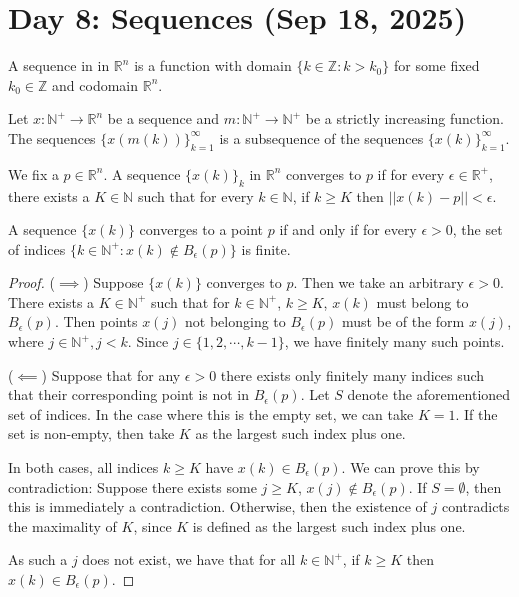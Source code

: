 \section{Day 8: Sequences (Sep 18, 2025)}

\begin{definition}[Sequence]
A sequence in in $\mathbb{R}^n$ is a function with domain $\{ k \in \mathbb{Z} : k > k_0 \}$ for some fixed $k_0 \in \mathbb{Z}$ and codomain $\mathbb{R}^n$. 
\end{definition}

\begin{definition}[Subsequence]
    Let $x : \mathbb{N}^+ \to \mathbb{R}^n$ be a sequence and $m : \mathbb{N}^+ \to \mathbb{N}^+$ be a strictly increasing function. The sequences $\{ x(m(k)) \}_{k=1}^\infty$ is a subsequence of the sequences $\{ x(k) \}_{k=1}^\infty$.
\end{definition}

\begin{definition}[Convergence]
    We fix a $p \in \mathbb{R}^n$. A sequence $\{ x(k) \}_k$ in $\mathbb{R}^n$ converges to $p$ if for every $\epsilon \in \mathbb{R}^+$, there exists a $K \in \mathbb{N}$ such that for every $k \in \mathbb{N}$, if $k \geq K$ then  $||x(k) - p|| < \epsilon$.
\end{definition}

\begin{simplethm}
    A sequence $\{ x(k) \}$ converges to a point $p$ if and only if for every $\epsilon > 0$, the set of indices $\{ k \in \mathbb{N}^+ : x(k) \not \in B_ \epsilon(p)\}$ is finite.
\end{simplethm}

\begin{proof}
    ($\implies$) Suppose $\{ x(k) \}$ converges to $p$. Then we take an arbitrary $\epsilon > 0$. There exists a $K \in \mathbb{N}^+$ such that for $k \in \mathbb{N}^+$, $k \geq K$, $x(k)$ must belong to $B _ \epsilon(p)$. Then points $x(j)$ not belonging to $B_ \epsilon(p)$ must be of the form $x(j)$, where $j \in \mathbb{N}^+, j < k$. Since $j \in \{ 1, 2, \cdots, k - 1 \}$, we have finitely many such points.

($\impliedby$) Suppose that for any $\epsilon > 0$ there exists only finitely many indices such that their corresponding point is not in $B_ \epsilon (p)$. Let $S$ denote the aforementioned set of indices. In the case where this is the empty set, we can take $K = 1$. If the set is non-empty, then take $K$ as the largest such index plus one. 

    In both cases, all indices $k \geq K$ have $x(k) \in B_ \epsilon (p)$. We can prove this by contradiction: Suppose there exists some $j \geq K$, $x(j) \not \in B_ \epsilon(p)$. If $S = \emptyset$, then this is immediately a contradiction. Otherwise, then the existence of $j$ contradicts the maximality of $K$, since $K$ is defined as the largest such index plus one. 

As such a $j$ does not exist, we have that for all $k \in \mathbb{N}^+$, if $k \geq K$ then $x(k) \in B _ \epsilon (p)$.
\end{proof}

